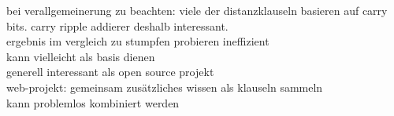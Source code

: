 bei verallgemeinerung zu beachten: viele der distanzklauseln basieren auf carry bits. carry ripple addierer deshalb interessant.\\

ergebnis im vergleich zu stumpfen probieren ineffizient\\
kann vielleicht als basis dienen\\

generell interessant als open source projekt\\
web-projekt: gemeinsam zusätzliches wissen als klauseln sammeln\\
kann problemlos kombiniert werden\\